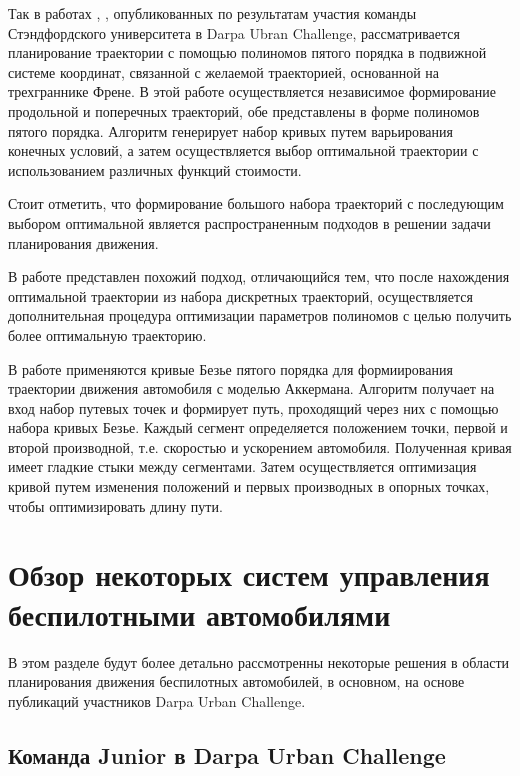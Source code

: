 Так в работах \cite{darpa_junior_path_planning_1}, \cite{darpa_junior_frenet},
опубликованных по результатам участия команды Стэндфордского университета в Darpa Ubran Challenge,
рассматривается планирование траектории с помощью полиномов пятого порядка в подвижной системе координат,
связанной с желаемой траекторией, основанной на трехграннике Френе.  В этой работе осуществляется независимое
формирование продольной и поперечных траекторий, обе представлены в форме полиномов пятого порядка. Алгоритм генерирует
набор кривых путем варьирования конечных условий, а затем осуществляется выбор оптимальной траектории с использованием
различных функций стоимости.

Стоит отметить, что формирование большого набора траекторий с последующим выбором оптимальной является распространенным
подходов в решении задачи планирования движения.

В работе \cite{motion_planning_interpolate_path_optimization} представлен похожий подход, отличающийся тем, что после
нахождения оптимальной траектории из набора дискретных траекторий, осуществляется дополнительная процедура оптимизации
параметров полиномов с целью получить более оптимальную траекторию.

В работе \cite{motion_planning_interpolate_bezier} применяются кривые Безье пятого порядка для формиирования траектории
движения автомобиля с моделью Аккермана. Алгоритм получает на вход набор путевых точек и формирует путь, проходящий
через них с помощью набора кривых Безье. Каждый сегмент определяется положением точки, первой и второй производной, т.е.
скоростью и ускорением автомобиля. Полученная кривая имеет гладкие стыки между сегментами. Затем осуществляется
оптимизация кривой путем изменения положений и первых производных в опорных точках, чтобы оптимизировать длину пути.

\section{Обзор некоторых систем управления беспилотными автомобилями}

В этом разделе будут более детально рассмотренны некоторые решения в области планирования движения беспилотных автомобилей,
в основном, на основе публикаций участников Darpa Urban Challenge.

\subsection{Команда Junior в Darpa Urban Challenge}

